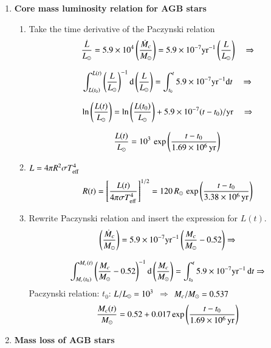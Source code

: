 \documentclass[11pt,a4paper,fleqn]{report}
\begin{document}

\begin{enumerate}

\item {\bf Core mass luminosity relation for AGB stars}\\

  \begin{enumerate}

  \item Take the time derivative of the Paczynski relation
    \[
    \frac{\dot L}{{L}_\odot}=5.9\times 10^4 \left(\frac{\dot M_c}{{M}_\odot}\right)
    = 5.9\times 10^{-7} \mathrm{yr}^{-1} 
    \left(\frac{L}{{L}_\odot }\right) \quad \Rightarrow
    \]

    \[
    \int_{L(t_0)}^{L(t)} \left( \frac{L}{{L}_\odot} \right)^{-1} \mathrm{d} \left(
      \frac{L}{{L}_\odot} \right) = \int_{t_0}^{t} 5.9\times 10^{-7}
    \mathrm{yr}^{-1} \mathrm{d} t \quad \Rightarrow
    \]

    \[
    \ln \left( \frac{L(t)}{{L}_\odot} \right) = \ln \left(
      \frac{L(t_0)}{{L}_\odot} \right) + 5.9\times 10^{-7} (t - t_0)/\mathrm{yr}
    \quad \Rightarrow
    \]
    
    \[
    \frac{L(t)}{{L}_\odot} = 10^3\, \exp \left(
      \frac{t-t_0}{1.69\times10^6\,\mathrm{yr}} \right)
    \]

  \item $L = 4 \pi R^2 \sigma T_{\rm eff}^4$
    \[
    R(t) = \left[ \frac{L(t)}{4 \pi \sigma T_{\rm eff}^4}
    \right]^{1/2} = 120\, {R}_\odot\, \exp
    \left( \frac{t-t_0}{3.38\times10^6\,\mathrm{yr}} \right)
    \]

  \item Rewrite Paczynski relation and insert the expression for
    $L(t)$.
    \[
    \left( \frac{\dot M_c}{{M}_\odot} \right) = 5.9 \times 10^{-7} 
    \mathrm{yr}^{-1} \left( \frac{M_c}{{M}_\odot} - 0.52 \right) \Rightarrow
    \]

    \[
    \int_{M_c(t_0)}^{M_c(t)} \left( \frac{M_c}{{M}_\odot} - 0.52 \right)^{-1}
    \mathrm{d} \left( \frac{M_c}{{M}_\odot} \right) = \int_{t_0}^{t} 5.9\times
    10^{-7}\mathrm{yr}^{-1}\, \mathrm{d} t \Rightarrow
    \]
    Paczynski relation: $t_0$: $L/{L}_\odot = 10^3$
    $\Rightarrow$ $M_c/{M}_\odot = 0.537$
    \[
    \frac{M_c(t)}{{M}_\odot} = 0.52 + 0.017\exp \left(
      \frac{t-t_0}{1.69\times10^6\,\mathrm{yr}} \right)
    \]

  \end{enumerate}


\item {\bf Mass loss of AGB stars} 


\end{enumerate}
\end{document}
